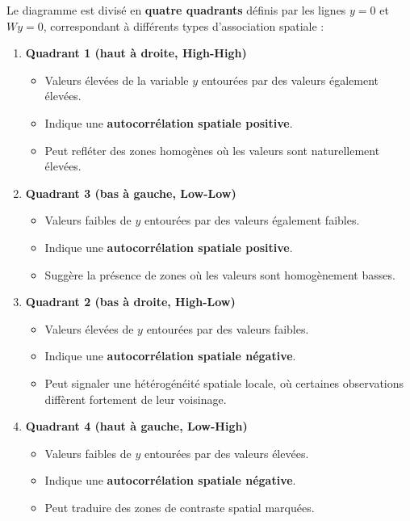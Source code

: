 \documentclass[
]{article}
\providecommand{\tightlist}{%
  \setlength{\itemsep}{0pt}\setlength{\parskip}{0pt}}
\begin{document}
Le diagramme est divisé en \textbf{quatre quadrants} définis par les
lignes \(y = 0\) et \(W y = 0\), correspondant à différents types
d'association spatiale :

\begin{enumerate}
\def\labelenumi{\arabic{enumi}.}
\tightlist
\item
  \textbf{Quadrant 1 (haut à droite, High-High)}

  \begin{itemize}
  \tightlist
  \item
    Valeurs élevées de la variable \(y\) entourées par des valeurs
    également élevées.\\
  \item
    Indique une \textbf{autocorrélation spatiale positive}.\\
  \item
    Peut refléter des zones homogènes où les valeurs sont naturellement
    élevées.
  \end{itemize}
\item
  \textbf{Quadrant 3 (bas à gauche, Low-Low)}

  \begin{itemize}
  \tightlist
  \item
    Valeurs faibles de \(y\) entourées par des valeurs également
    faibles.\\
  \item
    Indique une \textbf{autocorrélation spatiale positive}.\\
  \item
    Suggère la présence de zones où les valeurs sont homogènement
    basses.
  \end{itemize}
\item
  \textbf{Quadrant 2 (bas à droite, High-Low)}

  \begin{itemize}
  \tightlist
  \item
    Valeurs élevées de \(y\) entourées par des valeurs faibles.\\
  \item
    Indique une \textbf{autocorrélation spatiale négative}.\\
  \item
    Peut signaler une hétérogénéité spatiale locale, où certaines
    observations diffèrent fortement de leur voisinage.
  \end{itemize}
\item
  \textbf{Quadrant 4 (haut à gauche, Low-High)}

  \begin{itemize}
  \tightlist
  \item
    Valeurs faibles de \(y\) entourées par des valeurs élevées.\\
  \item
    Indique une \textbf{autocorrélation spatiale négative}.\\
  \item
    Peut traduire des zones de contraste spatial marquées.
  \end{itemize}
\end{enumerate}
\end{document}
